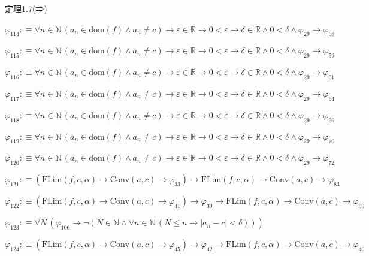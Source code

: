 \begin{fullproof}{定理1.7(⇒)}
\begin{abbrevlist}
\item $\varphi_{114} :\equiv \forall n \in \mathbb{N}\,(a_{n} \in \mathrm{dom}(f) \land a_{n} \neq c) \to \varepsilon \in \mathbb{R} \to 0 < \varepsilon \to \delta \in \mathbb{R} \land 0 < \delta \land \varphi_{29} \to \varphi_{58}$
\item $\varphi_{115} :\equiv \forall n \in \mathbb{N}\,(a_{n} \in \mathrm{dom}(f) \land a_{n} \neq c) \to \varepsilon \in \mathbb{R} \to 0 < \varepsilon \to \delta \in \mathbb{R} \land 0 < \delta \land \varphi_{29} \to \varphi_{59}$
\item $\varphi_{116} :\equiv \forall n \in \mathbb{N}\,(a_{n} \in \mathrm{dom}(f) \land a_{n} \neq c) \to \varepsilon \in \mathbb{R} \to 0 < \varepsilon \to \delta \in \mathbb{R} \land 0 < \delta \land \varphi_{29} \to \varphi_{61}$
\item $\varphi_{117} :\equiv \forall n \in \mathbb{N}\,(a_{n} \in \mathrm{dom}(f) \land a_{n} \neq c) \to \varepsilon \in \mathbb{R} \to 0 < \varepsilon \to \delta \in \mathbb{R} \land 0 < \delta \land \varphi_{29} \to \varphi_{64}$
\item $\varphi_{118} :\equiv \forall n \in \mathbb{N}\,(a_{n} \in \mathrm{dom}(f) \land a_{n} \neq c) \to \varepsilon \in \mathbb{R} \to 0 < \varepsilon \to \delta \in \mathbb{R} \land 0 < \delta \land \varphi_{29} \to \varphi_{66}$
\item $\varphi_{119} :\equiv \forall n \in \mathbb{N}\,(a_{n} \in \mathrm{dom}(f) \land a_{n} \neq c) \to \varepsilon \in \mathbb{R} \to 0 < \varepsilon \to \delta \in \mathbb{R} \land 0 < \delta \land \varphi_{29} \to \varphi_{70}$
\item $\varphi_{120} :\equiv \forall n \in \mathbb{N}\,(a_{n} \in \mathrm{dom}(f) \land a_{n} \neq c) \to \varepsilon \in \mathbb{R} \to 0 < \varepsilon \to \delta \in \mathbb{R} \land 0 < \delta \land \varphi_{29} \to \varphi_{72}$
\item $\varphi_{121} :\equiv (\mathrm{FLim}(f,c,\alpha) \to \mathrm{Conv}(a,c) \to \varphi_{33}) \to \mathrm{FLim}(f,c,\alpha) \to \mathrm{Conv}(a,c) \to \varphi_{83}$
\item $\varphi_{122} :\equiv (\mathrm{FLim}(f,c,\alpha) \to \mathrm{Conv}(a,c) \to \varphi_{41}) \to \varphi_{39} \to \mathrm{FLim}(f,c,\alpha) \to \mathrm{Conv}(a,c) \to \varphi_{39}$
\item $\varphi_{123} :\equiv \forall N\,(\varphi_{106} \to \neg (N \in \mathbb{N} \land \forall n \in \mathbb{N}\,(N \leq n \to \lvert a_{n} - c \rvert < \delta)))$
\item $\varphi_{124} :\equiv (\mathrm{FLim}(f,c,\alpha) \to \mathrm{Conv}(a,c) \to \varphi_{45}) \to \varphi_{42} \to \mathrm{FLim}(f,c,\alpha) \to \mathrm{Conv}(a,c) \to \varphi_{40}$

\end{abbrevlist}
\end{fullproof}
